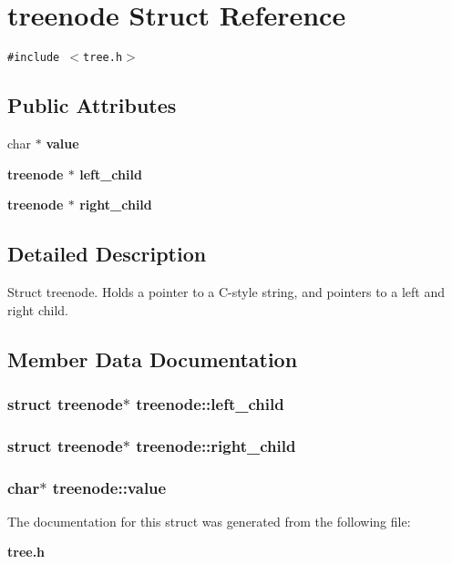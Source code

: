 \section{treenode Struct Reference}
\label{structtreenode}
{\tt \#include $<$tree.h$>$}

\subsection*{Public Attributes}
\begin{CompactItemize}
\item 
char $\ast$ \bf{value}
\item 
\bf{treenode} $\ast$ \bf{left\_\-child}
\item 
\bf{treenode} $\ast$ \bf{right\_\-child}
\end{CompactItemize}


\subsection{Detailed Description}
Struct treenode. Holds a pointer to a C-style string, and pointers to a left and right child. 



\subsection{Member Data Documentation}
\subsubsection{\setlength{\rightskip}{0pt plus 5cm}struct \bf{treenode}$\ast$ \bf{treenode::left\_\-child}}\label{structtreenode_714dbc826e392f601e3697a9474b1029}


\subsubsection{\setlength{\rightskip}{0pt plus 5cm}struct \bf{treenode}$\ast$ \bf{treenode::right\_\-child}}\label{structtreenode_3d6e7b5550913452ee51293dcb353bfa}


\subsubsection{\setlength{\rightskip}{0pt plus 5cm}char$\ast$ \bf{treenode::value}}\label{structtreenode_65f970ba36cd9af2486be12824175960}




The documentation for this struct was generated from the following file:\begin{CompactItemize}
\item 
\bf{tree.h}\end{CompactItemize}
